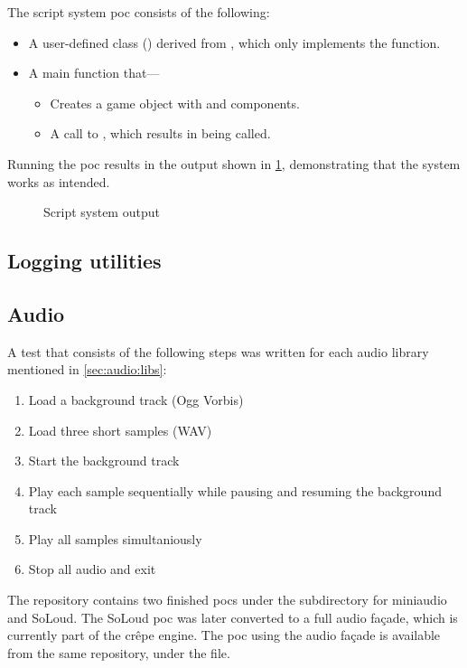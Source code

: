 \documentclass{projdoc}
\begin{document}
The script system \gls{poc} \autocite[script example]{crepe:code-repo} consists of
the following:\noparbreak
\begin{itemize}
	\item A user-defined class () derived from
		, which only implements the  function.
	\item A main function that---
		\begin{itemize}
			\item Creates a game object with  and
				 components.
			\item A call to , which results in
				 being called.
		\end{itemize}
\end{itemize}

Running the \gls{poc} results in the output shown in \cref{fig:poc-output-scripts},
demonstrating that the system works as intended.

\begin{figure}
	\centering
	\caption{Script system  output}
	\label{fig:poc-output-scripts}
\end{figure}

\subsection{Logging utilities}
\label{poc:log}

\subsection{Audio}
\label{poc:audio}

A test that consists of the following steps was written for each audio library
mentioned in \cref{sec:audio:libs}:\noparbreak
\begin{enumerate}
	\item Load a background track (Ogg Vorbis)
	\item Load three short samples (WAV)
	\item Start the background track
	\item Play each sample sequentially while pausing and resuming the background track
	\item Play all samples simultaniously
	\item Stop all audio and exit
\end{enumerate}

The repository \autocite{crepe:code-repo} contains two finished \glspl{poc} under the
 subdirectory for miniaudio and SoLoud. The SoLoud \gls{poc}
was later converted to a full audio fa\c{c}ade, which is currently part of the
cr\^epe engine. The \gls{poc} using the audio fa\c{c}ade is available from the same
repository, under the  file.
\end{document}
